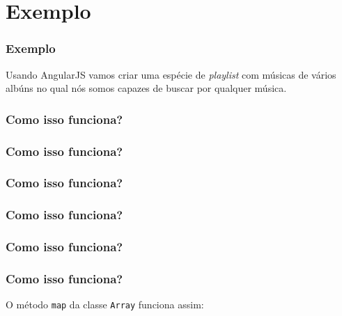 \section{Exemplo}

\begin{frame}\frametitle{Exemplo}

Usando AngularJS vamos criar uma espécie de \emph{playlist} com músicas
de vários albúns no qual nós somos capazes de buscar por qualquer
música.

\end{frame}

\begin{frame}\frametitle{Como isso funciona?}


\end{frame}

\begin{frame}\frametitle{Como isso funciona?}


\end{frame}

\begin{frame}\frametitle{Como isso funciona?}


\end{frame}

\begin{frame}\frametitle{Como isso funciona?}


\end{frame}

\begin{frame}\frametitle{Como isso funciona?}


\end{frame}

\begin{frame}[fragile]\frametitle{Como isso funciona?}

O método \texttt{map} da classe \texttt{Array} funciona assim:


\end{frame}


